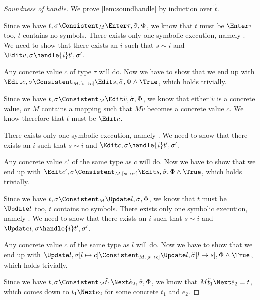 \begin{proof}[Soundness of handle]

  We prove \cref{lem:soundhandle} by induction over $\tilde{t}$.

 {
 Since we have $t,\sigma\Consistent_M\Enter \tau,\tilde{\sigma},\Phi$, we know that $t$ must be $\Enter \tau$ too, $\tilde{t}$ contains no symbols.
 There exists only one symbolic execution, namely .
 We need to show that there exists an $i$ such that $s\sim i$ and $\Edit v,\sigma\handle{i}t',\sigma'$.

 Any concrete value $c$ of type $\tau$ will do. Now we have to show that we end up with $\Edit c,\sigma\Consistent_{M.[s\mapsto c]}\Edit s,\tilde{\sigma},\Phi\land\True$, which holds trivially.
 }

  {
  Since we have $t,\sigma\Consistent_M\Edit \tilde{v},\tilde{\sigma},\Phi$, we know that either $\tilde{v}$ is a concrete value, or $M$ contains a mapping such that $M\tilde{v}$ becomes a concrete value $c$. We know therefore that $t$ must be $\Edit c$.

  There exists only one symbolic execution, namely .
  We need to show that there exists an $i$ such that $s\sim i$ and $\Edit c,\sigma\handle{i}t',\sigma'$.

  Any concrete value $c'$ of the same type as $c$ will do. Now we have to show that we end up with $\Edit c',\sigma\Consistent_{M.[s\mapsto c']}\Edit s,\tilde{\sigma},\Phi\land\True$, which holds trivially.
  }


{
Since we have $t,\sigma\Consistent_M\Update l,\tilde{\sigma},\Phi$, we know that $t$ must be $\Update l$ too, $\tilde{t}$ contains no symbols.
There exists only one symbolic execution, namely .
We need to show that there exists an $i$ such that $s\sim i$ and $\Update l,\sigma\handle{i}t',\sigma'$.

Any concrete value $c$ of the same type as $l$ will do. Now we have to show that we end up with $\Update l,\sigma[l\mapsto c]\Consistent_{M.[s\mapsto c]}\Update l,\tilde{\sigma}[l\mapsto s],\Phi\land\True$, which holds trivially.
}


 {
Since we have $t,\sigma\Consistent_M\tilde{t}_1\Next \tilde{e}_2,\tilde{\sigma},\Phi$, we know that $M \tilde{t}_1\Next \tilde{e}_2=t$, which comes down to $t_1\Next e_2$ for some concrete $t_1$ and $e_2$.

}
\end{proof}
